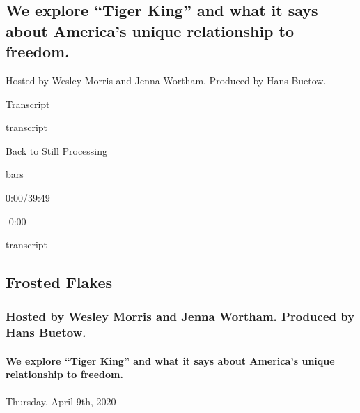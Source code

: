 \hypertarget{we-explore-tiger-king-and-what-it-says-about-americas-unique-relationship-to-freedom-1}{%
\subsection{We explore ``Tiger King'' and what it says about America's
unique relationship to
freedom.}\label{we-explore-tiger-king-and-what-it-says-about-americas-unique-relationship-to-freedom-1}}

Hosted by Wesley Morris and Jenna Wortham. Produced by Hans Buetow.

Transcript

transcript

Back to Still Processing

bars

0:00/39:49

-0:00

transcript

\hypertarget{frosted-flakes-2}{%
\subsection{Frosted Flakes}\label{frosted-flakes-2}}

\hypertarget{hosted-by-wesley-morris-and-jenna-wortham-produced-by-hans-buetow-1}{%
\subsubsection{Hosted by Wesley Morris and Jenna Wortham. Produced by
Hans
Buetow.}\label{hosted-by-wesley-morris-and-jenna-wortham-produced-by-hans-buetow-1}}

\hypertarget{we-explore-tiger-king-and-what-it-says-about-americas-unique-relationship-to-freedom-2}{%
\paragraph{We explore ``Tiger King'' and what it says about America's
unique relationship to
freedom.}\label{we-explore-tiger-king-and-what-it-says-about-americas-unique-relationship-to-freedom-2}}

Thursday, April 9th, 2020

